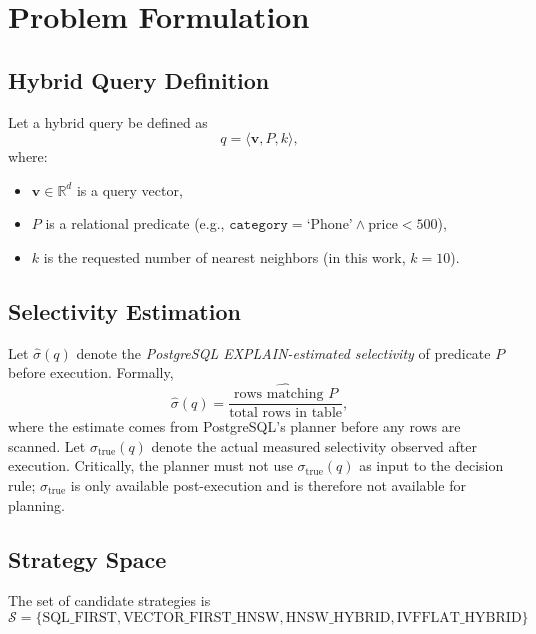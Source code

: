 \documentclass[10pt,twocolumn]{article}
\begin{document}
\section{Problem Formulation}
\label{sec:problem}

\subsection{Hybrid Query Definition}

Let a hybrid query be defined as
\begin{equation}
q = \langle \mathbf{v}, P, k \rangle,
\end{equation}
where:
\begin{itemize}
\item $\mathbf{v} \in \mathbb{R}^d$ is a query vector,
\item $P$ is a relational predicate (e.g., $\texttt{category} = \text{`Phone'} \land \text{price} < 500$),
\item $k$ is the requested number of nearest neighbors (in this work, $k = 10$).
\end{itemize}

\subsection{Selectivity Estimation}

Let $\hat{\sigma}(q)$ denote the \emph{PostgreSQL EXPLAIN-estimated selectivity} of predicate $P$ before execution. Formally,
\begin{equation}
\hat{\sigma}(q) = \frac{\widehat{\text{rows matching } P}}{\text{total rows in table}},
\end{equation}
where the estimate comes from PostgreSQL's planner before any rows are scanned. Let $\sigma_{\text{true}}(q)$ denote the actual measured selectivity observed after execution. Critically, the planner must not use $\sigma_{\text{true}}(q)$ as input to the decision rule; $\sigma_{\text{true}}$ is only available post-execution and is therefore not available for planning.

\subsection{Strategy Space}

The set of candidate strategies is
\begin{equation}
\mathcal{S} = \{\text{SQL\_FIRST}, \text{VECTOR\_FIRST\_HNSW}, \text{HNSW\_HYBRID}, \text{IVFFLAT\_HYBRID}\}
\label{eq:strategy-set}
\end{equation}
\end{document}
